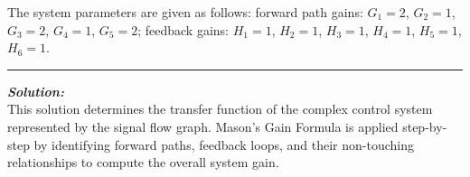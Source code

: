 \documentclass[11pt]{article}
\begin{document}
\noindent The system parameters are given as follows: forward path gains: \( G_1 = 2 \), \( G_2 = 1 \), \( G_3 = 2 \), \( G_4 = 1 \), \( G_5 = 2 \); feedback gains: \( H_1 = 1 \), \( H_2 = 1 \), \( H_3 = 1 \), \( H_4 = 1 \), \( H_5 = 1 \), \( H_6 = 1 \). \\
\noindent\rule{\textwidth}{1pt}

\vspace{12pt}   

\noindent \textbf{\textit{Solution:}}
\\ This solution determines the transfer function of the complex control system represented by the signal flow graph. Mason's Gain Formula is applied step-by-step by identifying forward paths, feedback loops, and their non-touching relationships to compute the overall system gain.\\
\end{document}
